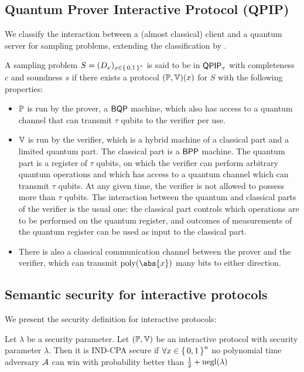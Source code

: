 \subsection{Quantum Prover Interactive Protocol (QPIP)}
We classify the interaction between a (almost classical) client and a quantum server for sampling problems, extending the classification by \cite{FOCS:Mahadev18a}.

\begin{definition}
	A sampling problem $S=(D_x)_{x\in\set{0, 1}^*}$ is said to be in $\operatorname{\mathsf{QPIP}}_\tau$ with completeness $c$ and soundness $s$ if there exists a protocol $(\mathbb{P}, \mathbb{V})(x)$ for $S$ with the following properties:
	\begin{itemize}
		\item $\mathbb{P}$ is run by the prover, a $\operatorname{\mathsf{BQP}}$ machine, which also has access to a quantum channel that can transmit $\tau$ qubits to the verifier per use.
		\item $\mathbb{V}$ is run by the verifier, which is a hybrid machine of a classical part and a limited quantum part. The classical part is a $\operatorname{\mathsf{BPP}}$ machine. The quantum part is a register of $\tau$ qubits, on which the verifier can perform arbitrary quantum operations and which has access to a quantum channel which can transmit $\tau$ qubits. At any given time, the verifier is not allowed to possess more than $\tau$ qubits. The interaction between the quantum and classical parts of the verifier is the usual one: the classical part controls which operations are to be performed on the quantum register, and outcomes of measurements of the quantum register can be used as input to the classical part.
		\item There is also a classical communication channel between the prover and the verifier, which can transmit $\poly(\abs{x})$ many bits to either direction. 
	\end{itemize}
\end{definition}

\subsection{Semantic security for interactive protocols}

We present the security definition for interactive protocols:

\begin{definition}
	Let $\lambda$ be a security parameter.
	Let $(\mathbb{P}, \mathbb{V})$ be an interactive protocol with security parameter $\lambda$.
	Then it is IND-CPA secure if $\forall x\in\set{0,1}^n$ no polynomial time adversary $\mathcal{A}$ can win  with probability better than $\frac{1}{2}+\operatorname{negl}(\lambda)$
\end{definition}

